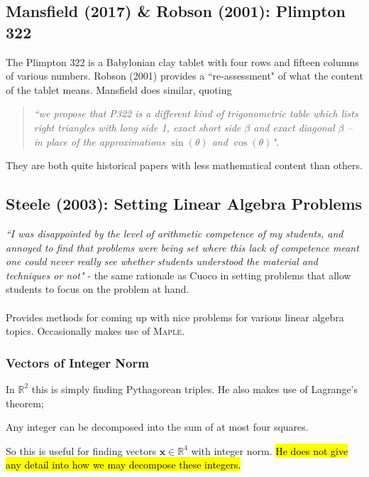 \documentclass[12pt]{article}
\newcommand{\R}{\mathbb{R}}
\begin{document}
\subsection{Mansfield (2017) \& Robson (2001): Plimpton 322}
The Plimpton 322 is a Babylonian clay tablet with four rows and fifteen columns of various numbers. Robson (2001) provides a ``re-assessment" of what the content of the tablet means. Mansfield does similar, quoting
\begin{quote}
    \textit{``we propose that P322 is a different kind of trigonometric table which lists right triangles with long side 1, exact short side $\beta$ and exact diagonal $\beta$ – in place of the approximations $\sin(\theta)$ and $\cos(\theta)$".}
\end{quote}
They are both quite historical papers with less mathematical content than others.

\subsection{Steele (2003): Setting Linear Algebra Problems}
\textit{``I was disappointed by the level of arithmetic competence of my students, and annoyed to find that problems were being set where this lack of competence meant one could never really see whether students understood the material and techniques or not"} - the same rationale as Cuoco in setting problems that allow students to focus on the problem at hand.\\\\
Provides methods for coming up with nice problems for various linear algebra topics. Occasionally makes use of \textsc{Maple}.

\subsubsection{Vectors of Integer Norm}
In $\R^2$ this is simply finding Pythagorean triples. He also makes use of Lagrange's theorem;
\begin{thm}{}{}
Any integer can be decomposed into the sum of at most four squares.
\end{thm}
So this is useful for finding vectors $\bm{x} \in \R^4$ with integer norm. \hl{He does not give any detail into how we may decompose these integers.}
\end{document}
